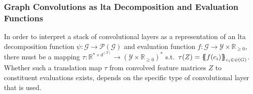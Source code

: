 \subsubsection{Graph Convolutions as \ac*{lta} Decomposition and Evaluation Functions}

In order to interpret a stack of convolutional layers as a representation of an \ac{lta} decomposition function $\psi: \mathcal{G} \to \mathcal{P}(\mathcal{G})$ and evaluation function $f: \mathcal{G} \to \mathcal{Y} \times \mathbb{R}_{\geq 0}$, there must be a mapping $\tau: \mathbb{R}^{* \times d^{(T)}} \to {(\mathcal{Y} \times \mathbb{R}_{\geq 0})}^{*}$ s.t.\ $\tau(Z) = {\ldblbrace f(c_i) \rdblbrace}_{c_i \in \psi(G)}$.
Whether such a translation map $\tau$ from convolved feature matrices $Z$ to constituent evaluations exists, depends on the specific type of convolutional layer that is used.

